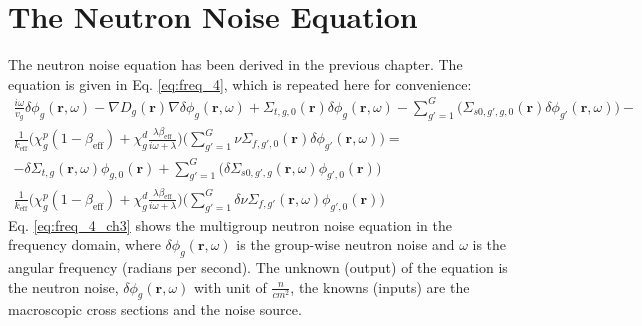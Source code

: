 \section{The Neutron Noise Equation}
The neutron noise equation has been derived in the previous chapter. The equation is given in Eq. \ref{eq:freq_4}, which is repeated here for convenience:
\begin{equation}
        \begin{aligned}
                \frac{i \omega}{v_g} \delta \phi_g (\textbf{r}, \omega) - \nabla D_g(\textbf{r}) \nabla \delta \phi_g(\textbf{r}, \omega) + \Sigma_{t,g,0}(\textbf{r}) \delta \phi_g(\textbf{r}, \omega) - \sum_{g' = 1}^{G} \biggl(\Sigma_{s0,g',g,0}(\textbf{r}) \delta \phi_{g'}(\textbf{r}, \omega) \biggr) -\\ \frac{1}{k_{\text{eff}}} \biggl( \chi^p_g (1-\beta_{\text{eff}}) + \chi^d_g \frac{\lambda \beta_{\text{eff}}}{i \omega + \lambda} \biggr)  \biggl(\sum_{g' = 1}^{G} \nu \Sigma_{f,g',0}(\textbf{r}) \delta \phi_{g'}(\textbf{r}, \omega) \biggr)= \\
                - \delta \Sigma_{t,g}(\textbf{r}, \omega) \phi_{g,0}(\textbf{r}) + \sum_{g' = 1}^{G} \biggl(\delta \Sigma_{s0,g',g}(\textbf{r}, \omega) \phi_{g',0}(\textbf{r}) \biggr)\\
                \frac{1}{k_{\text{eff}}} \biggl( \chi^p_g (1-\beta_{\text{eff}}) + \chi^d_g \frac{\lambda \beta_{\text{eff}}}{i \omega + \lambda} \biggr)  \biggl( \sum_{g' = 1}^{G} \delta \nu \Sigma_{f,g'}(\textbf{r}, \omega) \phi_{g',0}(\textbf{r}) \biggr)
        \end{aligned}
        \label{eq:freq_4_ch3}
\end{equation}
Eq. \ref{eq:freq_4_ch3} shows the multigroup neutron noise equation in the frequency domain, where $\delta \phi_g (\textbf{r}, \omega)$ is the group-wise neutron noise and $\omega$ is the angular frequency (radians per second). The unknown (output) of the equation is the neutron noise, $\delta \phi_g (\textbf{r}, \omega)$ with unit of $\frac{n}{cm^2}$, the knowns (inputs) are the macroscopic cross sections and the noise source.


